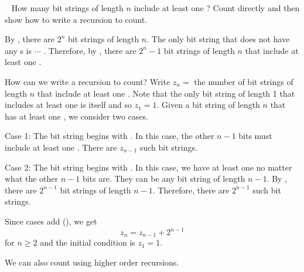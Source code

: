 \begin{exam}
\label{exam_count_bit_strings_using_recursion_first}
~
    How many bit strings of length $n$ include at least one ?  Count directly and then show how to write a recursion to count.
    
        \begin{soln}
            By , there are $2^n$ bit strings of length $n$.  The only bit string that does not have any s is  $\cdots$ .  Therefore, by , there are $2^n-1$ bit strings of length $n$ that include at least one .
                 
            How can we write a recursion to count?  Write $z_n=$ the number of bit strings of length $n$ that include at least one .  Note that the only bit string of length 1 that includes at least one  is  itself and so $z_1=1$.  Given a bit string of length $n$ that has at least one , we consider two cases.  
            
            Case 1: The bit string begins with .  In this case, the other $n-1$ bits must include at least one .  There are $z_{n-1}$ such bit strings.

            Case 2: The bit string begins with .  In this case, we have at least one  no matter what the other $n-1$ bits are. They can be any bit string of length $n-1$.  By , there are $2^{n-1}$ bit strings of length $n-1$.  Therefore, there are $2^{n-1}$ such bit strings.

            Since cases add (), we get 
                $$z_n=z_{n-1}+2^{n-1}$$  
            for $n\ge 2$ and the initial condition is $z_1=1$.
        \end{soln}
\end{exam}

We can also count using higher order recursions.

